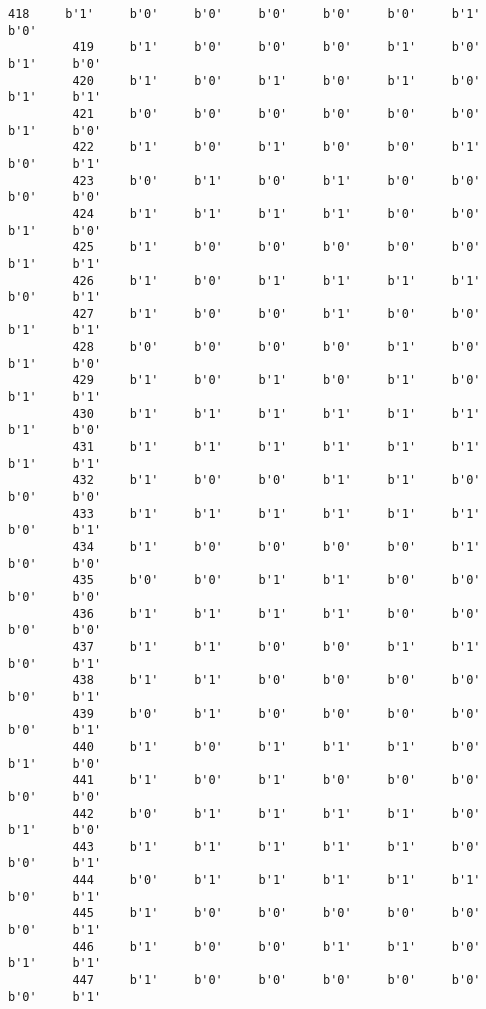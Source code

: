 \documentclass[11pt]{article}
\begin{document}
\begin{Verbatim}[commandchars=\\\{\}]
         418     b'1'     b'0'     b'0'     b'0'     b'0'     b'0'     b'1'     b'0'   
         419     b'1'     b'0'     b'0'     b'0'     b'1'     b'0'     b'1'     b'0'   
         420     b'1'     b'0'     b'1'     b'0'     b'1'     b'0'     b'1'     b'1'   
         421     b'0'     b'0'     b'0'     b'0'     b'0'     b'0'     b'1'     b'0'   
         422     b'1'     b'0'     b'1'     b'0'     b'0'     b'1'     b'0'     b'1'   
         423     b'0'     b'1'     b'0'     b'1'     b'0'     b'0'     b'0'     b'0'   
         424     b'1'     b'1'     b'1'     b'1'     b'0'     b'0'     b'1'     b'0'   
         425     b'1'     b'0'     b'0'     b'0'     b'0'     b'0'     b'1'     b'1'   
         426     b'1'     b'0'     b'1'     b'1'     b'1'     b'1'     b'0'     b'1'   
         427     b'1'     b'0'     b'0'     b'1'     b'0'     b'0'     b'1'     b'1'   
         428     b'0'     b'0'     b'0'     b'0'     b'1'     b'0'     b'1'     b'0'   
         429     b'1'     b'0'     b'1'     b'0'     b'1'     b'0'     b'1'     b'1'   
         430     b'1'     b'1'     b'1'     b'1'     b'1'     b'1'     b'1'     b'0'   
         431     b'1'     b'1'     b'1'     b'1'     b'1'     b'1'     b'1'     b'1'   
         432     b'1'     b'0'     b'0'     b'1'     b'1'     b'0'     b'0'     b'0'   
         433     b'1'     b'1'     b'1'     b'1'     b'1'     b'1'     b'0'     b'1'   
         434     b'1'     b'0'     b'0'     b'0'     b'0'     b'1'     b'0'     b'0'   
         435     b'0'     b'0'     b'1'     b'1'     b'0'     b'0'     b'0'     b'0'   
         436     b'1'     b'1'     b'1'     b'1'     b'0'     b'0'     b'0'     b'0'   
         437     b'1'     b'1'     b'0'     b'0'     b'1'     b'1'     b'0'     b'1'   
         438     b'1'     b'1'     b'0'     b'0'     b'0'     b'0'     b'0'     b'1'   
         439     b'0'     b'1'     b'0'     b'0'     b'0'     b'0'     b'0'     b'1'   
         440     b'1'     b'0'     b'1'     b'1'     b'1'     b'0'     b'1'     b'0'   
         441     b'1'     b'0'     b'1'     b'0'     b'0'     b'0'     b'0'     b'0'   
         442     b'0'     b'1'     b'1'     b'1'     b'1'     b'0'     b'1'     b'0'   
         443     b'1'     b'1'     b'1'     b'1'     b'1'     b'0'     b'0'     b'1'   
         444     b'0'     b'1'     b'1'     b'1'     b'1'     b'1'     b'0'     b'1'   
         445     b'1'     b'0'     b'0'     b'0'     b'0'     b'0'     b'0'     b'1'   
         446     b'1'     b'0'     b'0'     b'1'     b'1'     b'0'     b'1'     b'1'   
         447     b'1'     b'0'     b'0'     b'0'     b'0'     b'0'     b'0'     b'1'   

\end{Verbatim}
\end{document}
